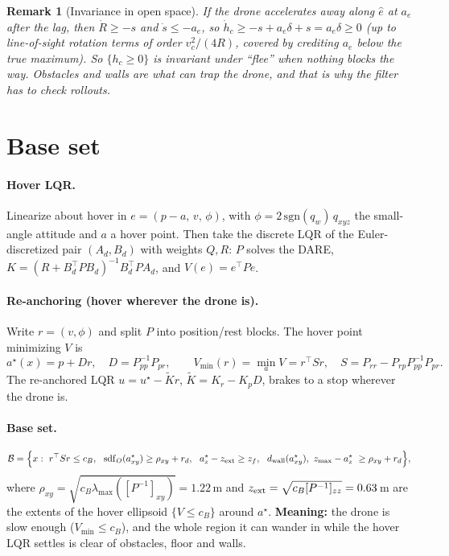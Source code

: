\documentclass[11pt]{article}
\newcommand{\sdf}{\operatorname{sdf}}
\newcommand{\Base}{\mathcal{B}}
\newtheorem*{remark}{Remark}
\begin{document}
\begin{remark}[Invariance in open space]
If the drone accelerates away along $\hat e$ at $a_e$ after the lag, then $\dot R\ge-s$ and $\dot s\le-a_e$, so
$\dot h_c\ge -s+a_e\delta+s=a_e\delta\ge0$ (up to line-of-sight rotation terms of order $v_c^2/(4R)$, covered by crediting $a_e$ below the true maximum).
So $\{h_c\ge0\}$ is invariant under ``flee'' when nothing blocks the way. Obstacles and walls are what can trap the drone, and that is why the filter has to check rollouts.
\end{remark}

\section{Base set}\label{sec:base}

\paragraph{Hover LQR.}
Linearize about hover in $e=(p-a,\,v,\,\phi)$, with $\phi=2\,\mathrm{sgn}(q_w)\,q_{xyz}$ the small-angle attitude and $a$ a hover point.
Then take the discrete LQR of the Euler-discretized pair $(A_d,B_d)$ with weights $Q,R$: $P$ solves the DARE, $K=(R+B_d^\top PB_d)^{-1}B_d^\top PA_d$, and $V(e)=e^\top Pe$.

\paragraph{Re-anchoring (hover wherever the drone is).}
Write $r=(v,\phi)$ and split $P$ into position/rest blocks. The hover point minimizing $V$ is
\begin{equation}
a^\star(x)=p+Dr,\quad D=P_{pp}^{-1}P_{pr},\qquad
V_{\min}(r)=\min_a V=r^\top S r,\quad S=P_{rr}-P_{rp}P_{pp}^{-1}P_{pr}.
\end{equation}
The re-anchored LQR $u=u^\star-\tilde K r$, $\tilde K=K_r-K_pD$, brakes to a stop wherever the drone is.

\paragraph{Base set.}
\begin{equation}
\Base=\Big\{x:\ r^\top Sr\le c_B,\ \ \sdf_O(a^\star_{xy})\ge\rho_{xy}+r_d,\ \ a^\star_z-z_{\rm ext}\ge z_f,\ \ d_{\rm wall}(a^\star_{xy}),\ z_{\max}-a^\star_z\ \ge\rho_{xy}+r_d\Big\},
\end{equation}
where $\rho_{xy}=\sqrt{c_B\lambda_{\max}([P^{-1}]_{xy})}=1.22$\,m and $z_{\rm ext}=\sqrt{c_B[P^{-1}]_{zz}}=0.63$\,m are the extents of the hover ellipsoid $\{V\le c_B\}$ around $a^\star$.
\textbf{Meaning:} the drone is slow enough ($V_{\min}\le c_B$), and the whole region it can wander in while the hover LQR settles is clear of obstacles, floor and walls.
\end{document}
